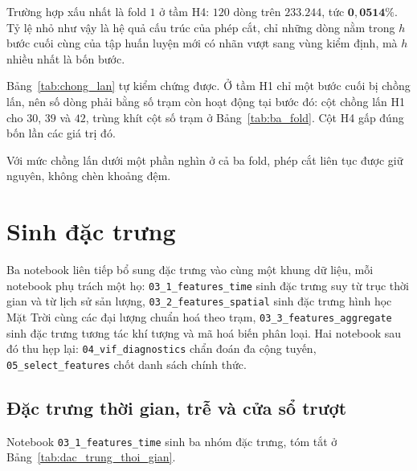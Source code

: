 \documentclass[12pt, a4paper]{report}
\begin{document}
Trường hợp xấu nhất là fold $1$ ở tầm H4: $120$ dòng trên $233.244$, tức
$\mathbf{0{,}0514\%}$. Tỷ lệ nhỏ như vậy là hệ quả cấu trúc của phép cắt, chỉ những dòng
nằm trong $h$ bước cuối cùng của tập huấn luyện mới có nhãn vượt sang vùng kiểm định, mà
$h$ nhiều nhất là bốn bước.

Bảng~\ref{tab:chong_lan} tự kiểm chứng được. Ở tầm H1 chỉ một bước cuối bị chồng
lấn, nên số dòng phải bằng số trạm còn hoạt động tại bước đó: cột chồng lấn H1 cho $30$,
$39$ và $42$, trùng khít cột số trạm ở Bảng~\ref{tab:ba_fold}. Cột H4 gấp đúng bốn lần các
giá trị đó.

Với mức chồng lấn dưới một phần nghìn ở cả ba fold, phép cắt liên tục được giữ nguyên,
không chèn khoảng đệm.

\FloatBarrier
\section{Sinh đặc trưng}

Ba notebook liên tiếp bổ sung đặc trưng vào cùng một khung dữ liệu, mỗi notebook phụ trách
một họ: \texttt{03\_1\_features\_time} sinh đặc trưng suy từ trục thời gian và từ lịch sử sản
lượng, \texttt{03\_2\_features\_spatial} sinh đặc trưng hình học Mặt Trời cùng các đại lượng chuẩn
hoá theo trạm, \texttt{03\_3\_features\_aggregate} sinh đặc trưng tương tác khí tượng và mã hoá
biến phân loại. Hai notebook sau đó thu hẹp lại: \texttt{04\_vif\_diagnostics} chẩn đoán đa cộng
tuyến, \texttt{05\_select\_features} chốt danh sách chính thức.

\FloatBarrier
\subsection{Đặc trưng thời gian, trễ và cửa sổ trượt}

Notebook \texttt{03\_1\_features\_time} sinh ba nhóm đặc trưng, tóm tắt ở
Bảng~\ref{tab:dac_trung_thoi_gian}.
\end{document}
